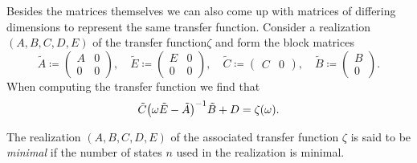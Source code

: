 \begin{remark}
    Besides the matrices themselves we can also come up with matrices of differing dimensions to represent the same transfer function.
    Consider a realization $(A, B, C, D, E)$ of the transfer function$\zeta$ and form the block matrices
    \begin{equation*}
        \tilde{A} \coloneqq \begin{pmatrix}
            A & 0 \\
            0 & 0
        \end{pmatrix},\quad \tilde{E} \coloneqq \begin{pmatrix}
            E & 0 \\
            0 & 0
        \end{pmatrix},\quad \tilde{C} \coloneqq \begin{pmatrix}
            C & 0
        \end{pmatrix},\quad \tilde{B} \coloneqq \begin{pmatrix}
            B \\
            0
        \end{pmatrix}.
    \end{equation*}
    When computing the transfer function we find that
    \begin{equation*}
        \tilde{C} {\left( \omega \tilde{E} - \tilde{A} \right)}^{-1} \tilde{B} + D = \zeta(\omega).
    \end{equation*}
\end{remark}

\begin{definition}\label{def:minimal-system}
    The realization $(A, B, C, D, E)$ of the associated transfer function $\zeta$ is said to be \emph{minimal} if the number of states $n$ used in the realization is minimal.
\end{definition}

